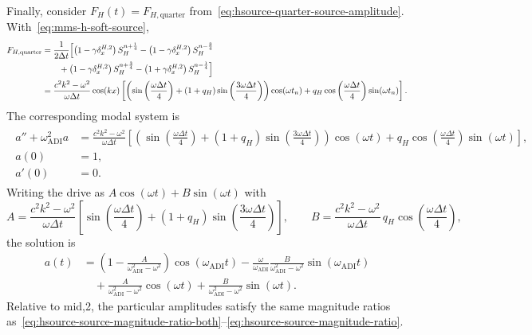 \documentclass{article}
\numberwithin{figure}{section}
\begin{document}
Finally, consider $F_H(t)=F_{H,\mathrm{quarter}}$ from~\eqref{eq:hsource-quarter-source-amplitude}.
With~\eqref{eq:mms-h-soft-source},
\begin{align}
    \begin{split}
        F_{H,\mathrm{quarter}}
         & =\frac{1}{2\Delta t}\Bigl[
        \left(1-\gamma\delta_x^{H,2}\right)S_H^{n+\frac{1}{4}}
        -\left(1-\gamma\delta_x^{H,2}\right)S_H^{n-\frac{3}{4}}    \\
         & \qquad
        +\left(1-\gamma\delta_x^{H,2}\right)S_H^{n+\frac{3}{4}}
        -\left(1+\gamma\delta_x^{H,2}\right)S_H^{n-\frac{1}{4}}
        \Bigr]                                                   \\
         & =\frac{c^2k^2-\omega^2}{\omega\Delta t}\cos(kx)\left[
            \left(\sin\left(\frac{\omega\Delta t}{4}\right)
            +(1+q_H)\sin\left(\frac{3\omega\Delta t}{4}\right)\right)\cos(\omega t_n)
            +q_H\cos\left(\frac{\omega\Delta t}{4}\right)\sin(\omega t_n)
            \right].
    \end{split}
    \label{eq:mms-h-F-quarter-real}
\end{align}
The corresponding modal system is
\begin{align}
    \begin{split}
        a''+\omega_{\mathrm{ADI}}^2 a
         & =\frac{c^2k^2-\omega^2}{\omega\Delta t}\left[
            \left(\sin\left(\frac{\omega\Delta t}{4}\right)
            +(1+q_H)\sin\left(\frac{3\omega\Delta t}{4}\right)\right)\cos(\omega t)
            +q_H\cos\left(\frac{\omega\Delta t}{4}\right)\sin(\omega t)
        \right],                                            \\
        a(0)
         & =1,                                              \\
        a'(0)
         & =0.
    \end{split}
    \label{eq:mms-h-forced-quarter}
\end{align}
Writing the drive as $A\cos(\omega t)+B\sin(\omega t)$ with
\begin{equation}
    A=\frac{c^2k^2-\omega^2}{\omega\Delta t}\left[
        \sin\left(\frac{\omega\Delta t}{4}\right)
        +(1+q_H)\sin\left(\frac{3\omega\Delta t}{4}\right)
    \right],\qquad
    B=\frac{c^2k^2-\omega^2}{\omega\Delta t}\,q_H\cos\left(\frac{\omega\Delta t}{4}\right),
    \label{eq:mms-h-quarter-AB}
\end{equation}
the solution is
\begin{equation}
    \begin{aligned}
        a(t)
         & =\left(1-\frac{A}{\omega_{\mathrm{ADI}}^2-\omega^2}\right)\cos(\omega_{\mathrm{ADI}}t)
        -\frac{\omega}{\omega_{\mathrm{ADI}}}\frac{B}{\omega_{\mathrm{ADI}}^2-\omega^2}\sin(\omega_{\mathrm{ADI}}t) \\
         & \quad+\frac{A}{\omega_{\mathrm{ADI}}^2-\omega^2}\cos(\omega t)
        +\frac{B}{\omega_{\mathrm{ADI}}^2-\omega^2}\sin(\omega t).
    \end{aligned}
    \label{eq:mms-h-solution-quarter}
\end{equation}
Relative to mid,2, the particular amplitudes satisfy the same magnitude ratios as~\eqref{eq:hsource-source-magnitude-ratio-both}--\eqref{eq:hsource-source-magnitude-ratio}.
\end{document}
